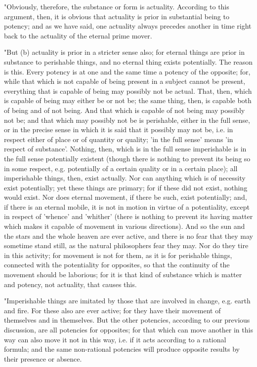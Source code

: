 "Obviously, therefore, the substance or form is actuality. According
to this argument, then, it is obvious that actuality is prior in substantial
being to potency; and as we have said, one actuality always precedes
another in time right back to the actuality of the eternal prime mover.

"But (b) actuality is prior in a stricter sense also; for eternal
things are prior in substance to perishable things, and no eternal
thing exists potentially. The reason is this. Every potency is at
one and the same time a potency of the opposite; for, while that which
is not capable of being present in a subject cannot be present, everything
that is capable of being may possibly not be actual. That, then, which
is capable of being may either be or not be; the same thing, then,
is capable both of being and of not being. And that which is capable
of not being may possibly not be; and that which may possibly not
be is perishable, either in the full sense, or in the precise sense
in which it is said that it possibly may not be, i.e. in respect either
of place or of quantity or quality; 'in the full sense' means 'in
respect of substance'. Nothing, then, which is in the full sense imperishable
is in the full sense potentially existent (though there is nothing
to prevent its being so in some respect, e.g. potentially of a certain
quality or in a certain place); all imperishable things, then, exist
actually. Nor can anything which is of necessity exist potentially;
yet these things are primary; for if these did not exist, nothing
would exist. Nor does eternal movement, if there be such, exist potentially;
and, if there is an eternal mobile, it is not in motion in virtue
of a potentiality, except in respect of 'whence' and 'whither' (there
is nothing to prevent its having matter which makes it capable of
movement in various directions). And so the sun and the stars and
the whole heaven are ever active, and there is no fear that they may
sometime stand still, as the natural philosophers fear they may. Nor
do they tire in this activity; for movement is not for them, as it
is for perishable things, connected with the potentiality for opposites,
so that the continuity of the movement should be laborious; for it
is that kind of substance which is matter and potency, not actuality,
that causes this. 

"Imperishable things are imitated by those that are involved in change,
e.g. earth and fire. For these also are ever active; for they have
their movement of themselves and in themselves. But the other potencies,
according to our previous discussion, are all potencies for opposites;
for that which can move another in this way can also move it not in
this way, i.e. if it acts according to a rational formula; and the
same non-rational potencies will produce opposite results by their
presence or absence. 

